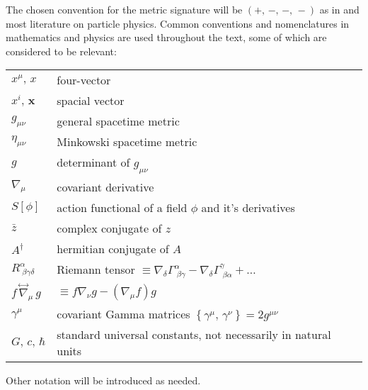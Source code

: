 
The chosen convention for the metric signature will be $(+,\,-,\,-,\,-)$ as in \cite{BirrellDavies} and most literature on particle physics. Common conventions and nomenclatures in mathematics and physics are used throughout the text, some of which are considered to be relevant:\newline

\begin{tabular}{p{1.75cm}p{10cm}}
	
	$x^\mu,\,x$ & four-vector \\
	$x^i,\,\mathbf{x}$ & spacial vector \\
	$g_{\mu\nu}$ & general spacetime metric \\
	$\eta_{\mu\nu}$ & Minkowski spacetime metric \\
	$g$ & determinant of $g_{\mu\nu}$ \\
	$\nabla_\mu$ & covariant derivative \\
	$S[\phi]$ & action functional of a field $\phi$ and it's derivatives \\
	$\bar{z}$ & complex conjugate of $z$ \\
	$A^\dagger$ & hermitian conjugate of $A$\\
	$R^\alpha_{\;\beta\gamma\delta}$ & Riemann tensor \quad $\equiv \nabla_\delta\Gamma^\alpha_{\;\beta\gamma}-\nabla_\delta\Gamma^\gamma_{\;\beta\alpha}+\hdots$\\
	$f\,\overset{\leftrightarrow}{\nabla}_\mu\, g$ &$\equiv f\nabla_\nu g-\left(\nabla_\mu f\right)g$ \\
	$\gamma^\mu$ & covariant Gamma matrices $\left\{\gamma^\mu,\,\gamma^\nu\right\}=2g^{\mu\nu}$ \\
	$G,\,c,\,\hbar$ & standard universal constants, not necessarily in natural units \\
	
\end{tabular}

\vspace*{0.5cm}
Other notation will be introduced as needed.